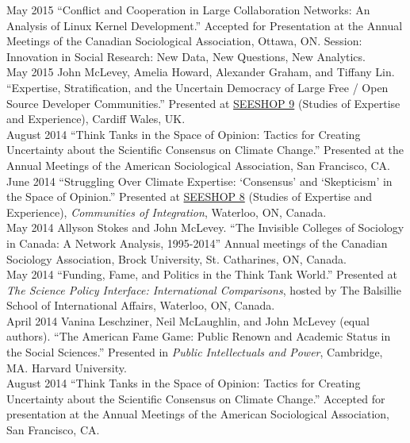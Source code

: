\documentclass[9pt,usenames,dvipsnames]{article}
\begin{document}
\ind May 2015 ``Conflict and Cooperation in Large Collaboration Networks: An Analysis of Linux Kernel Development.'' Accepted for Presentation at the Annual Meetings of the Canadian Sociological Association, Ottawa, ON. Session: Innovation in Social Research: New Data, New Questions, New Analytics.\\

\ind May 2015 John McLevey, Amelia Howard, Alexander Graham, and Tiffany Lin. ``Expertise, Stratification, and the Uncertain Democracy of Large Free / Open Source Developer Communities.'' Presented at \href{http://www.cf.ac.uk/socsi/contactsandpeople/harrycollins/expertise-project/seeshophome.html}{SEESHOP 9} (Studies of Expertise and Experience), Cardiff Wales, UK. \\

\ind August 2014 ``Think Tanks in the Space of Opinion: Tactics for Creating Uncertainty about the Scientific Consensus on Climate Change.'' Presented at the Annual Meetings of the American Sociological Association, San Francisco, CA. \\

\ind June 2014 ``Struggling Over Climate Expertise: `Consensus' and `Skepticism' in the Space of Opinion.'' Presented at \href{http://www.cf.ac.uk/socsi/contactsandpeople/harrycollins/expertise-project/seeshophome.html}{SEESHOP 8} (Studies of Expertise and Experience), \emph{Communities of Integration}, Waterloo, ON, Canada. \\

\ind May 2014 Allyson Stokes and John McLevey. ``The Invisible Colleges of Sociology in Canada: A Network Analysis, 1995-2014'' Annual meetings of the Canadian Sociology Association, Brock University, St. Catharines, ON, Canada.\\

\ind May 2014 ``Funding, Fame, and Politics in the Think Tank World.'' Presented at \emph{The Science Policy Interface: International Comparisons}, hosted by The Balsillie School of International Affairs, Waterloo, ON, Canada. \\

\ind April 2014 Vanina Leschziner, Neil McLaughlin, and John McLevey (equal authors). ``The American Fame Game: Public Renown and Academic Status in the Social Sciences.'' Presented in \emph{Public Intellectuals and Power}, Cambridge, MA. Harvard University. \\

\ind August 2014 ``Think Tanks in the Space of Opinion: Tactics for Creating Uncertainty about the Scientific Consensus on Climate Change.'' Accepted for presentation at the Annual Meetings of the American Sociological Association, San Francisco, CA. \\
\end{document}
